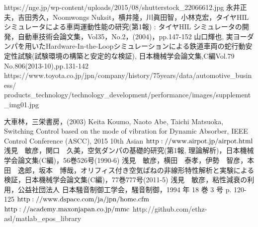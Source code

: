 \documentclass[a4paper,12pt]{article_vdlab_sotsuron}
\begin{document}
\newpage
\begin{thebibliography}{99}
https://nge.jp/wp-content/uploads/2015/08/shutterstock\_22066612.jpg
永井正夫，吉田秀久，Noomwongs Nuksit，横井隆，川眞田智，小林克宏，タイヤHIL シミュレータによる車両運動性能の研究(第1報) : タイヤHIL シミュレータの開発，自動車技術会論文集，Vol35，No.2，(2004)，pp.147-152
山口輝也, 実ヨーダンパを用いたHardware-In-the-Loopシミュレーションによる鉄道車両の蛇行動安定性試験(試験環境の構築と安定的な検証), 日本機械学会論文集,C編Vol.79 No.806(2013-10),pp.131-142
https://www.toyota.co.jp/jpn/company/history/75years/data/automotive\_business/ \\ products\_technology/technology\_development/performance/images/supplement\_img01.jpg

大車林，三栄書房，(2003)
Keita Koumo, Naoto Abe, Taichi Matsuoka, Switching Control based on the mode of vibration for Dynamic Absorber, IEEE Control Conference (ASCC), 2015 10th Asian
$\rm{http://www.airpot.jp/airpot.html}$
浅見　敏彦，関口　久美，空気ダンパの基礎的研究(第1報, 理論解析)，日本機械学会論文集(C編)，56巻526号(1990-6)
浅見　敏彦，横田　泰孝，伊勢　智彦，本田　逸郎，坂本　博哉，オリフィス付き空気ばねの非線形特性解析と実験による検証，日本機械学会論文集(C編)，77巻777号(2011-5)
浅見　敏彦，粘性減衰の利用，公益社団法人 日本騒音制御工学会，騒音制御，1994 年 18 巻 3 号 p. 120-125
$\rm{http://www.dspace.com/ja/jpn/home.cfm}$
$\rm{http://academy.maxonjapan.co.jp/mmc}$
http://github.com/ethz-asl/matlab\_epos\_library
\end{thebibliography}
\end{document}
